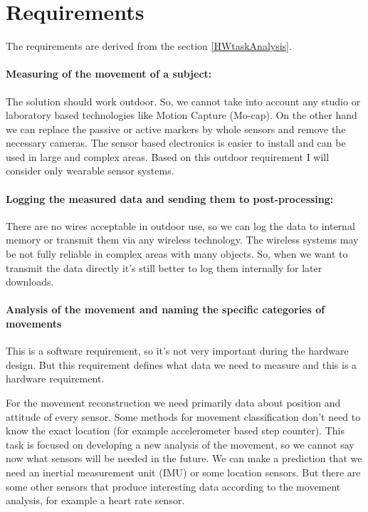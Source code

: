 \documentclass[12pt,a4paper]{article}
\begin{document}
\section{Requirements}
The requirements are derived from the section \ref{HWtaskAnalysis}.

\paragraph{Measuring of the movement of a subject:} The solution should work outdoor. So, we cannot take into account any studio or laboratory based technologies like Motion Capture (Mo-cap). On the other hand we can replace the passive or active markers by whole sensors and remove the necessary cameras. The sensor based electronics is easier to install and can be used in large and complex areas. Based on this outdoor requirement I will consider only wearable sensor systems.

\paragraph{Logging the measured data and sending them to post-processing:} There are no wires acceptable in outdoor use, so we can log the data to internal memory or transmit them via any wireless technology. The wireless systems may be not fully reliable in complex areas with many objects. So, when we want to transmit the data directly it's still better to log them internally for later downloads.

\paragraph{Analysis of the movement and naming the specific categories of movements} This is a software requirement, so it's not very important during the hardware design. But this requirement defines what data we need to measure and this is a hardware requirement.

For the movement reconstruction we need primarily data about position and attitude of every sensor. Some methods for movement classification don't need to know the exact location (for example accelerometer based step counter). This task is focused on developing a new analysis of the movement, so we cannot say now what sensors will be needed in the future. We can make a prediction that we need an inertial measurement unit (IMU) or some location sensors. But there are some other sensors that produce interesting data according to the movement analysis, for example a heart rate sensor.
\end{document}
